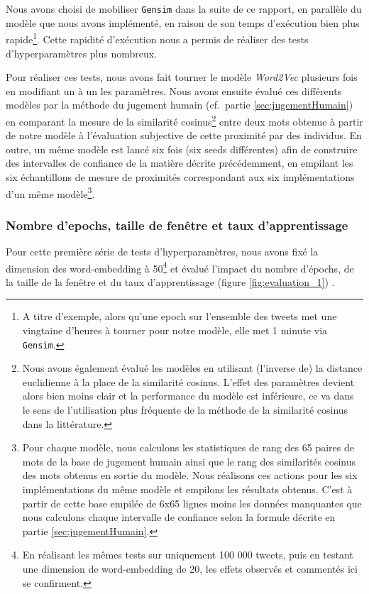 \documentclass[11pt,french,french]{article}
\let\rmarkdownfootnote\footnote%
\def\footnote{\protect\rmarkdownfootnote}
\begin{document}
Nous avons choisi de mobiliser \texttt{Gensim} dans la suite de ce rapport, en parallèle du modèle que nous avons implémenté, en raison de son temps d'exécution bien plus rapide\footnote{A titre d'exemple, alors qu'une epoch sur l'ensemble des tweets met une vingtaine d'heures à tourner pour \og notre \fg{} modèle, elle met 1 minute via \texttt{Gensim}.}. Cette rapidité d'exécution nous a permis de réaliser des tests d'hyperparamètres plus nombreux.

Pour réaliser ces tests, nous avons fait tourner le modèle \emph{Word2Vec} plusieurs fois en modifiant un à un les paramètres. Nous avons ensuite évalué ces différents modèles par la méthode du \og jugement humain \fg{} (cf.~partie \ref{sec:jugementHumain}) en comparant la mesure de la similarité cosinus\footnote{Nous avons également évalué les modèles en utilisant (l'inverse de) la distance euclidienne à la place de la similarité cosinus. L'effet des paramètres devient alors bien moins clair et la performance du modèle est inférieure, ce va dans le sens de l'utilisation plus fréquente de la méthode de la similarité cosinus dans la littérature.} entre deux mots obtenue à partir de notre modèle à l'évaluation subjective de cette proximité par des individus. En outre, un même modèle est lancé six fois (six \og seeds \fg{} différentes) afin de construire des intervalles de confiance de la matière décrite précédemment, en empilant les six échantillons de mesure de proximités correspondant aux six implémentations d'un même modèle\footnote{Pour chaque modèle, nous calculons les statistiques de rang des 65 paires de mots de la base de jugement humain ainsi que le rang des similarités cosinus des mots obtenus en sortie du modèle. Nous réalisons ces actions pour les six implémentations du même modèle et empilons les résultats obtenus. C'est à partir de cette base empilée de 6x65 lignes moins les données manquantes que nous calculons chaque intervalle de confiance selon la formule décrite en partie \ref{sec:jugementHumain}.}.

\hypertarget{nombre-depochs-taille-de-fenuxeatre-et-taux-dapprentissage}{%
\subsubsection{Nombre d'epochs, taille de fenêtre et taux d'apprentissage}\label{nombre-depochs-taille-de-fenuxeatre-et-taux-dapprentissage}}

Pour cette première série de tests d'hyperparamètres, nous avons fixé la dimension des word-embedding à 50\footnote{En réalisant les mêmes tests sur uniquement 100 000 tweets, puis en testant une dimension de word-embedding de 20, les effets observés et commentés ici se confirment.} et évalué l'impact du nombre d'épochs, de la taille de la fenêtre et du taux d'apprentissage (figure \ref{fig:evaluation_1}) .
\end{document}
